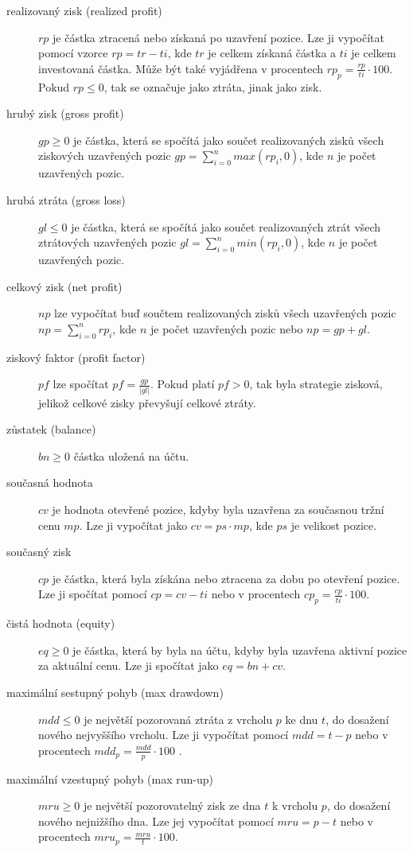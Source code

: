 \begin{description}
    \item [realizovaný zisk (realized profit)] $rp$ je částka ztracená nebo získaná po uzavření pozice.
    Lze ji vypočítat pomocí vzorce $rp=tr-ti$, kde $tr$ je celkem získaná částka a $ti$ je celkem investovaná částka.
    Může být také vyjádřena v procentech $rp_p=\frac{rp}{ti}\cdot 100$.
    Pokud $rp\leq0$, tak se označuje jako ztráta, jinak jako zisk.
    \item[hrubý zisk (gross profit)] $gp\geq0$ je částka, která se spočítá jako součet realizovaných zisků všech ziskových uzavřených pozic $gp=\sum_{i=0}^{n} max(rp_i, 0)$, kde $n$ je počet uzavřených pozic.
    \item[hrubá ztráta (gross loss)] $gl\leq0$ je částka, která se spočítá jako součet realizovaných ztrát všech ztrátových uzavřených pozic $gl=\sum_{i=0}^{n} min(rp_i, 0)$, kde $n$ je počet uzavřených pozic.
    \item[celkový zisk (net profit)] $np$ lze vypočítat buď součtem realizovaných zisků všech uzavřených pozic $np=\sum_{i=0}^{n} rp_i$, kde $n$ je počet uzavřených pozic nebo $np=gp+gl$.
    \item [ziskový faktor (profit factor)] $pf$ lze spočítat $pf=\frac{gp}{|gl|}$.
    Pokud platí $pf>0$, tak byla strategie zisková, jelikož celkové zisky převyšují celkové ztráty.
    \item[zůstatek (balance)] $bn\geq0$ částka uložená na účtu.
    \item[současná hodnota] $cv$ je hodnota otevřené pozice, kdyby byla uzavřena za současnou tržní cenu $mp$.
    Lze ji vypočítat jako $cv=ps\cdot mp$, kde $ps$ je velikost pozice.
    \item[současný zisk] $cp$ je částka, která byla získána nebo ztracena za dobu po otevření pozice.
    Lze ji spočítat pomocí $cp=cv-ti$ nebo v procentech $cp_p = \frac{cp}{ti}\cdot 100$.
    \item[čistá hodnota (equity)] $eq\geq0$ je částka, která by byla na účtu, kdyby byla uzavřena aktivní pozice za aktuální cenu.
    Lze ji spočítat jako $eq=bn+cv$.
    \item[maximální sestupný pohyb (max drawdown)] $mdd\leq0$ je největší pozorovaná ztráta z vrcholu $p$ ke dnu $t$, do dosažení nového nejvyššího vrcholu.
    Lze ji vypočítat pomocí $mdd=t-p$ nebo v procentech $mdd_p=\frac{mdd}{p}\cdot 100$ \cite{max-drawdown}.
    \item[maximální vzestupný pohyb (max run-up)] $mru\geq0$ je největší pozorovatelný zisk ze dna $t$ k vrcholu $p$, do dosažení nového nejnižšího dna.
    Lze jej vypočítat pomocí $mru=p-t$ nebo v procentech $mru_p=\frac{mru}{t}\cdot 100$.
\end{description}

